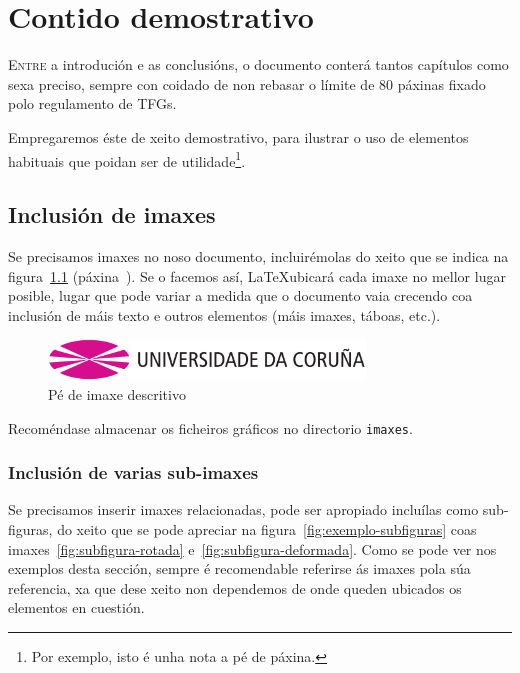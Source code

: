 \chapter{Contido demostrativo}
\label{chap:demo}

\lettrine{E}{ntre} a introdución e as conclusións, o documento conterá
tantos capítulos como sexa preciso, sempre con coidado de non rebasar
o límite de 80 páxinas fixado polo regulamento de TFGs.

Empregaremos éste de xeito demostrativo, para ilustrar o uso de
elementos habituais que poidan ser de utilidade\footnote{Por exemplo,
  isto é unha nota a pé de páxina.}.

\section{Inclusión de imaxes}

Se precisamos imaxes no noso documento, incluirémolas do xeito que se
indica na figura~\ref{fig:exemplo} (páxina~\pageref{fig:exemplo}). Se
o facemos así, \LaTeX ubicará cada imaxe no mellor lugar posible,
lugar que pode variar a medida que o documento vaia crecendo coa
inclusión de máis texto e outros elementos (máis imaxes, táboas,
etc.).

\begin{figure}[hp!]
  \centering
  \includegraphics[width=0.75\textwidth]{imaxes/udc.png}
  \caption{Pé de imaxe descritivo}
  \label{fig:exemplo}
\end{figure}

Recoméndase almacenar os ficheiros gráficos no directorio
\texttt{imaxes}.

\subsection{Inclusión de varias sub-imaxes}

Se precisamos inserir imaxes relacionadas, pode ser apropiado
incluílas como sub-figuras, do xeito que se pode apreciar na
figura~\ref{fig:exemplo-subfiguras} coas
imaxes~\ref{fig:subfigura-rotada}
e~\ref{fig:subfigura-deformada}. Como se pode ver nos exemplos desta
sección, sempre é recomendable referirse ás imaxes pola súa
referencia, xa que dese xeito non dependemos de onde queden ubicados
os elementos en cuestión.

